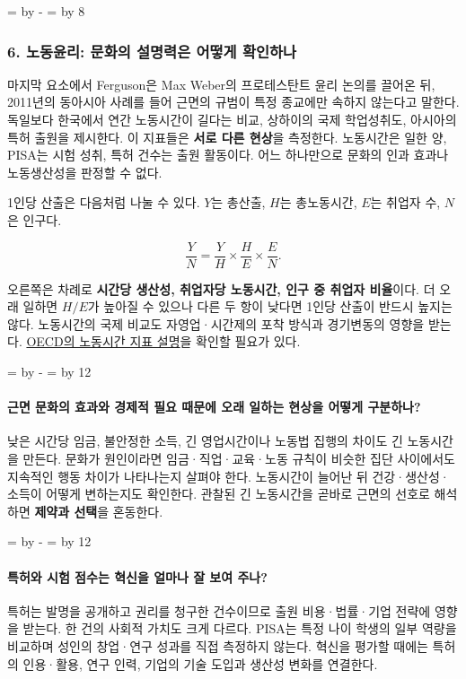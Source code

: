 \documentclass[10pt,a4paper]{article}
\newcommand{\ReserveQuestionSpace}{%
  \par\begingroup
  \dimen0=\pagegoal \advance\dimen0 by -\pagetotal
  \dimen2=\baselineskip \multiply\dimen2 by 12
  \ifdim\dimen0<\dimen2 \newpage\fi
  \endgroup}
\newcommand{\ReserveReadingSectionSpace}{%
  \par\begingroup
  \dimen0=\pagegoal \advance\dimen0 by -\pagetotal
  \dimen2=\baselineskip \multiply\dimen2 by 8
  \ifdim\dimen0<\dimen2 \newpage\fi
  \endgroup}
\begin{document}
\ReserveReadingSectionSpace
\subsubsection*{6. 노동윤리: 문화의 설명력은 어떻게 확인하나}

마지막 요소에서 Ferguson은 Max Weber의 프로테스탄트 윤리 논의를 끌어온 뒤, 2011년의 동아시아 사례를 들어 근면의 규범이 특정 종교에만 속하지 않는다고 말한다. 독일보다 한국에서 연간 노동시간이 길다는 비교, 상하이의 국제 학업성취도, 아시아의 특허 출원을 제시한다. 이 지표들은 \textbf{서로 다른 현상}을 측정한다. 노동시간은 일한 양, PISA는 시험 성취, 특허 건수는 출원 활동이다. 어느 하나만으로 문화의 인과 효과나 노동생산성을 판정할 수 없다.\par

1인당 산출은 다음처럼 나눌 수 있다. $Y$는 총산출, $H$는 총노동시간, $E$는 취업자 수, $N$은 인구다.\par

\[
\frac{Y}{N}=\frac{Y}{H}\times\frac{H}{E}\times\frac{E}{N}.
\]

오른쪽은 차례로 \textbf{시간당 생산성, 취업자당 노동시간, 인구 중 취업자 비율}이다. 더 오래 일하면 $H/E$가 높아질 수 있으나 다른 두 항이 낮다면 1인당 산출이 반드시 높지는 않다. 노동시간의 국제 비교도 자영업·시간제의 포착 방식과 경기변동의 영향을 받는다. \href{https://www.oecd.org/en/publications/2019/04/oecd-compendium-of-productivity-indicators-2019\_e126c59f/full-report/component-40.html}{OECD의 노동시간 지표 설명}을 확인할 필요가 있다.\par

\ReserveQuestionSpace
\paragraph{근면 문화의 효과와 경제적 필요 때문에 오래 일하는 현상을 어떻게 구분하나?}
낮은 시간당 임금, 불안정한 소득, 긴 영업시간이나 노동법 집행의 차이도 긴 노동시간을 만든다. 문화가 원인이라면 임금·직업·교육·노동 규칙이 비슷한 집단 사이에서도 지속적인 행동 차이가 나타나는지 살펴야 한다. 노동시간이 늘어난 뒤 건강·생산성·소득이 어떻게 변하는지도 확인한다. 관찰된 긴 노동시간을 곧바로 근면의 선호로 해석하면 \textbf{제약과 선택}을 혼동한다.\par

\ReserveQuestionSpace
\paragraph{특허와 시험 점수는 혁신을 얼마나 잘 보여 주나?}
특허는 발명을 공개하고 권리를 청구한 건수이므로 출원 비용·법률·기업 전략에 영향을 받는다. 한 건의 사회적 가치도 크게 다르다. PISA는 특정 나이 학생의 일부 역량을 비교하며 성인의 창업·연구 성과를 직접 측정하지 않는다. 혁신을 평가할 때에는 특허의 인용·활용, 연구 인력, 기업의 기술 도입과 생산성 변화를 연결한다.\par
\end{document}

